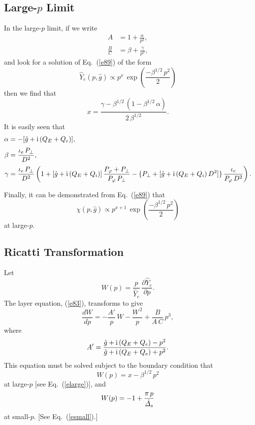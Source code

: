 \documentclass[12pt,prb,aps]{revtex4-1}
\begin{document}
\subsection{Large-$p$ Limit}
In the large-$p$ limit, if we write
\begin{align}
A &=1+\frac{\alpha}{p^2},\\[0.5ex]
\frac{B}{C} &= \beta+\frac{\gamma}{p^2},
\end{align}
and
look for a solution of Eq.~(\ref{e89}) of the form
\begin{equation}\label{elarge}
\hat{Y}_e(p,\hat{g}) \propto p^x\,\exp\left(\frac{-\beta^{1/2}\,p^2}{2}\right)
\end{equation}
then we find that
\begin{equation}
x = \frac{\gamma -\beta^{1/2}\,(1-\beta^{1/2}\,\alpha)}{2\,\beta^{1/2}}.
\end{equation}
It is easily seen that
\begin{align}
\alpha &= -[\hat{g}+ {\rm i}\,(Q_E+Q_e)],\\[0.5ex]
\beta&= \frac{\iota_e\,P_\perp}{D^2},\\[0.5ex]
\gamma&= \frac{\iota_e\,P_\perp}{D^2}\left(1+ [\hat{g}+{\rm i}\,(Q_E+Q_i)]\,\frac{P_\varphi+P_\perp}{P_\varphi\,P_\perp}
-\{P_\perp+[\hat{g}+{\rm i}\,(Q_E+Q_i)\,D^2]\}\,\frac{\iota_e}{P_\varphi\,D^2}\right).
\end{align}

Finally, it can be demonstrated from Eq.~(\ref{e89}) that
\begin{equation}\label{elargea}
\chi(p,\hat{g}) \propto p^{x+1}\,\exp\left(\frac{-\beta^{1/2}\,p^2}{2}\right)
\end{equation}
at large-$p$. 

\subsection{Ricatti Transformation}
Let 
\begin{equation}
W(p)= \frac{p}{\hat{Y}_e}\,\frac{\partial\hat{Y}_e}{\partial p}.
\end{equation}
The layer equation, (\ref{e83}), transforms to give\,\cite{park}
\begin{equation}\label{e72a}
\frac{dW}{dp} =- \frac{A'}{p}\,W -\frac{W^{\,2}}{p} + \frac{B}{A\,C}\,p^3,
\end{equation}
where
\begin{equation}
A' = \frac{\hat{g}+{\rm i}\,(Q_E+Q_e)-p^2}{\hat{g}+{\rm i}\,(Q_E+Q_e)+p^2}.
\end{equation}
This equation must be solved subject to the boundary condition that
\begin{equation}\label{e63a}
W(p) = x-\beta^{1/2}\,p^2
\end{equation}
at large-$p$ [see Eq.~(\ref{elarge})], and
\begin{equation}\label{e73ax}
W(p) =-1+\frac{\pi\,p}{\hat{\mit\Delta}_s}
\end{equation}
at small-$p$. [See Eq.~(\ref{esmall}).]
\end{document}
